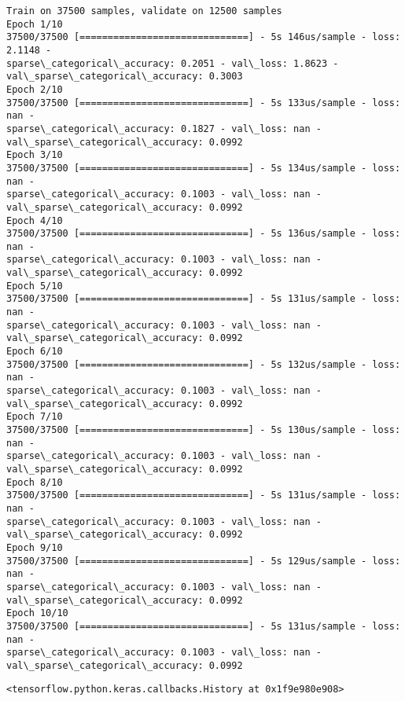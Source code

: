 \documentclass[11pt]{article}
\makeatletter
\newcommand{\boxspacing}{\kern\kvtcb@left@rule\kern\kvtcb@boxsep}
\newcommand{\prompt}[4]{
        \ttfamily\llap{{\color{#2}[#3]:\hspace{3pt}#4}}\vspace{-\baselineskip}
    }
\makeatother
\begin{document}
    \begin{Verbatim}[commandchars=\\\{\}]
Train on 37500 samples, validate on 12500 samples
Epoch 1/10
37500/37500 [==============================] - 5s 146us/sample - loss: 2.1148 -
sparse\_categorical\_accuracy: 0.2051 - val\_loss: 1.8623 -
val\_sparse\_categorical\_accuracy: 0.3003
Epoch 2/10
37500/37500 [==============================] - 5s 133us/sample - loss: nan -
sparse\_categorical\_accuracy: 0.1827 - val\_loss: nan -
val\_sparse\_categorical\_accuracy: 0.0992
Epoch 3/10
37500/37500 [==============================] - 5s 134us/sample - loss: nan -
sparse\_categorical\_accuracy: 0.1003 - val\_loss: nan -
val\_sparse\_categorical\_accuracy: 0.0992
Epoch 4/10
37500/37500 [==============================] - 5s 136us/sample - loss: nan -
sparse\_categorical\_accuracy: 0.1003 - val\_loss: nan -
val\_sparse\_categorical\_accuracy: 0.0992
Epoch 5/10
37500/37500 [==============================] - 5s 131us/sample - loss: nan -
sparse\_categorical\_accuracy: 0.1003 - val\_loss: nan -
val\_sparse\_categorical\_accuracy: 0.0992
Epoch 6/10
37500/37500 [==============================] - 5s 132us/sample - loss: nan -
sparse\_categorical\_accuracy: 0.1003 - val\_loss: nan -
val\_sparse\_categorical\_accuracy: 0.0992
Epoch 7/10
37500/37500 [==============================] - 5s 130us/sample - loss: nan -
sparse\_categorical\_accuracy: 0.1003 - val\_loss: nan -
val\_sparse\_categorical\_accuracy: 0.0992
Epoch 8/10
37500/37500 [==============================] - 5s 131us/sample - loss: nan -
sparse\_categorical\_accuracy: 0.1003 - val\_loss: nan -
val\_sparse\_categorical\_accuracy: 0.0992
Epoch 9/10
37500/37500 [==============================] - 5s 129us/sample - loss: nan -
sparse\_categorical\_accuracy: 0.1003 - val\_loss: nan -
val\_sparse\_categorical\_accuracy: 0.0992
Epoch 10/10
37500/37500 [==============================] - 5s 131us/sample - loss: nan -
sparse\_categorical\_accuracy: 0.1003 - val\_loss: nan -
val\_sparse\_categorical\_accuracy: 0.0992
    \end{Verbatim}

            \begin{tcolorbox}[breakable, size=fbox, boxrule=.5pt, pad at break*=1mm, opacityfill=0]
\prompt{Out}{outcolor}{32}{\boxspacing}
\begin{Verbatim}[commandchars=\\\{\}]
<tensorflow.python.keras.callbacks.History at 0x1f9e980e908>
\end{Verbatim}
\end{tcolorbox}
        
\end{document}
